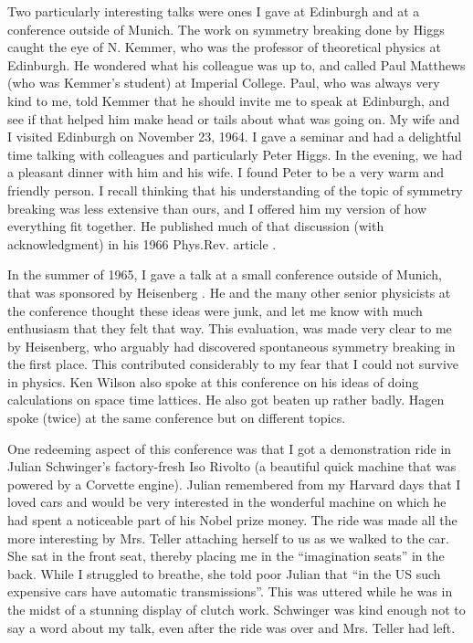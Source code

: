 \documentclass[12pt]{article}
\begin{document}
   Two particularly interesting talks were ones I gave at Edinburgh and at a
   conference outside of Munich.  The work on symmetry breaking done by Higgs
   caught the eye of N. Kemmer, who was the professor of theoretical physics
   at Edinburgh. He wondered what his colleague was up to, and called Paul
   Matthews (who was Kemmer's student) at Imperial College. Paul, who was
   always very kind to me, told Kemmer that he should invite me to speak at
   Edinburgh, and see if that helped him make head or tails about what was
   going on. My wife and I visited Edinburgh on November 23, 1964. I gave a
   seminar and had a delightful time talking with colleagues and particularly
   Peter Higgs.  In the evening, we had a pleasant dinner with him and his
   wife. I found Peter to be a very warm and friendly person. I recall
   thinking that his understanding of the topic of symmetry breaking was less
   extensive than ours, and I offered him my version of how everything fit
   together. He published much of that discussion (with acknowledgment) in his
   1966 Phys.Rev. article \cite{phr;1965}.

   In the summer of 1965, I gave a talk at a small conference outside
   of Munich, that was sponsored by Heisenberg \cite{hc;1965}. He and
   the many other senior physicists at the conference thought these
   ideas were junk, and let me know with much enthusiasm that they
   felt that way. This evaluation, was made very clear to me by
   Heisenberg, who arguably had discovered spontaneous symmetry
   breaking in the first place. This contributed considerably to my
   fear that I could not survive in physics. Ken Wilson also spoke at
   this conference on his ideas of doing calculations on space time
   lattices. He also got beaten up rather badly. Hagen spoke (twice)
   at the same conference but on different topics.

   One redeeming aspect of this conference was that I got a demonstration
   ride in Julian Schwinger's factory-fresh Iso Rivolto (a beautiful quick
   machine that was powered by a Corvette engine). Julian remembered from my
   Harvard days that I loved cars and would
   be very interested in the wonderful machine on which he had spent a
   noticeable part of his Nobel prize money. The ride was made all the more
   interesting by Mrs. Teller attaching herself to us as we walked to the
   car. She sat in the front seat, thereby placing
   me in the ``imagination seats'' in the back. While I struggled to breathe, she
   told poor Julian that ``in the US such expensive cars have automatic
   transmissions''. This was uttered while he was in the midst of a stunning display of
   clutch work. Schwinger was kind enough not to say a word about my talk, even
   after the ride was over and Mrs. Teller had left.
\end{document}
